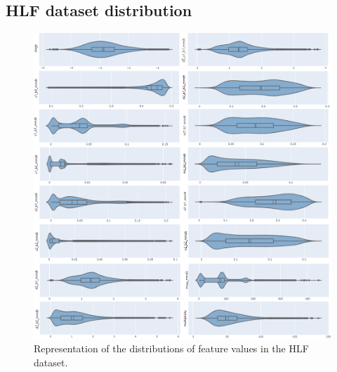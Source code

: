 \begin{appendices}

\chapter{HLF dataset distribution}
\begin{figure}[hpt!]
  \centering
  \includegraphics[trim={0cm 0cm 0cm 0cm}, width=1.0\textwidth, center]{background/distributions.png}
  \caption{Representation of the distributions of feature values in the HLF dataset.}
  \label{fig:distributions-hlf}
\end{figure}



\end{appendices}
